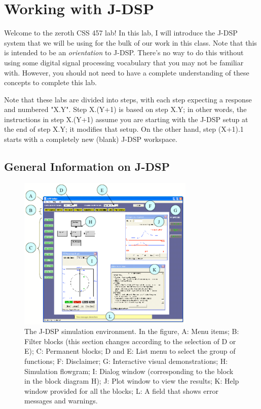 
\section{Working with J-DSP}

Welcome to the zeroth CSS 457 lab! In this lab, I will introduce the
J-DSP system that we will be using for the bulk of our work in this
class. 
Note that this is intended to be an
\emph{orientation} to J-DSP. There's no way to do this without using
some digital signal processing vocabulary that you may not be familiar
with. However, you should not need to have a complete understanding of
these concepts to complete this lab. 

Note that these labs are divided into steps, with each step expecting a
response and numbered "X.Y". Step X.(Y+1) is based on step X.Y; in other
words, the instructions in step X.(Y+1) assume you are starting with the
J-DSP setup at the end of step X.Y; it modifies that setup. On the other
hand, step (X+1).1 starts with a completely new (blank) J-DSP workspace.

\subsection{General Information on J-DSP}

\begin{figure}
\begin{center}
\includegraphics[width=0.75\textwidth]{lab1/simenv}
\end{center}
\caption{The J-DSP simulation environment. In the figure, A: Menu
  items; B: Filter blocks (this section changes according to the
  selection of D or E); C: Permanent blocks; D and E: List menu to
  select the group of functions; F: Disclaimer; G: Interactive visual
  demonstrations; H: Simulation flowgram; I: Dialog window
  (corresponding to the  block in the block
  diagram H); J: Plot window to view the results; K: Help window
  provided for all the blocks; L: A field that shows error messages
  and warnings.\label{fg:simenv}}
\end{figure}

